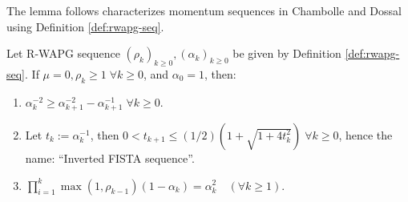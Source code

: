 \documentclass[12pt]{article}
\begin{document}
    The lemma follows characterizes momentum sequences in Chambolle and Dossal \cite{chambolle_convergence_2015} using Definition \ref{def:rwapg-seq}.
    \begin{lemma}\label{lemma:inverted-fista-seq}
        Let R-WAPG sequence $(\rho_k)_{k \ge 0}, (\alpha_k)_{k \ge 0}$ be given by Definition \ref{def:rwapg-seq}.
        If $\mu = 0, \rho_k \ge 1\; \forall k \ge 0$, and $\alpha_0 = 1$, then:
        \begin{enumerate}
            \item $\alpha_k^{-2} \ge \alpha_{k + 1}^{-2} - \alpha_{k + 1}^{-1}\; \forall k \ge 0$.
            \item Let $t_k := \alpha_k^{-1}$, then $0 < t_{k + 1} \le (1/2)\left(1 + \sqrt{1 + 4t_k^2}\right)\;\forall k\ge 0$, hence the name: ``Inverted FISTA sequence''.
            \item $\prod_{i = 1}^k\max(1, \rho_{k - 1})(1 - \alpha_k) = \alpha_k^2 \quad (\forall k \ge 1)$.
        \end{enumerate}
    \end{lemma}
\end{document}

